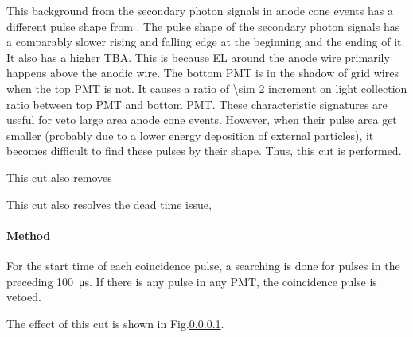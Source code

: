 This background from the secondary photon signals in anode cone events has a different pulse shape from \eep . The pulse shape of the secondary photon signals has a comparably slower rising and falling edge at the beginning and the ending of it. It also has a higher TBA. This is because EL around the anode wire primarily happens above the anodic wire. The bottom PMT is in the shadow of grid wires when the top PMT is not. It causes a ratio of \num{\sim 2} increment on light collection ratio between top PMT and bottom PMT. These characteristic signatures are useful for veto large area anode cone events. However, when their pulse area get smaller (probably due to a lower energy deposition of external particles), it becomes difficult to find these pulses by their shape. Thus, this cut is performed.  

This cut also removes 

This cut also resolves the dead time issue, 

\paragraph{Method}
For the start time of each coincidence pulse, a searching is done for pulses in the preceding \SI{100}{\us}. If there is any pulse in any PMT, the coincidence pulse is vetoed. 

The effect of this cut is shown in Fig.\ref{}. 

